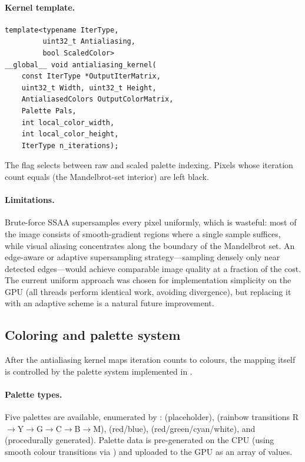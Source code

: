\paragraph{Kernel template.}
\begin{verbatim}
template<typename IterType,
         uint32_t Antialiasing,
         bool ScaledColor>
__global__ void antialiasing_kernel(
    const IterType *OutputIterMatrix,
    uint32_t Width, uint32_t Height,
    AntialiasedColors OutputColorMatrix,
    Palette Pals,
    int local_color_width,
    int local_color_height,
    IterType n_iterations);
\end{verbatim}
The  flag selects between raw and scaled palette
indexing.  Pixels whose iteration count equals 
(the Mandelbrot-set interior) are left black.

\paragraph{Limitations.}
Brute-force SSAA supersamples every pixel uniformly, which is
wasteful: most of the image consists of smooth-gradient regions where
a single sample suffices, while visual aliasing concentrates along the
boundary of the Mandelbrot set.  An edge-aware or adaptive
supersampling strategy---sampling densely only near detected
edges---would achieve comparable image quality at a fraction of the
cost.  The current uniform approach was chosen for implementation
simplicity on the GPU (all threads perform identical work, avoiding
divergence), but replacing it with an adaptive scheme is a natural
future improvement.

\subsection{Coloring and palette system}
\label{subsec:coloring}

After the antialiasing kernel maps iteration counts to colours, the
mapping itself is controlled by the palette system implemented in
.

\paragraph{Palette types.}
Five palettes are available, enumerated by
:
 (placeholder),
 (rainbow transitions R$\to$Y$\to$G$\to$C$\to$B$\to$M),
 (red/blue),
 (red/green/cyan/white), and
 (procedurally generated).
Palette data is pre-generated on the CPU (using smooth colour
transitions via ) and uploaded to the GPU as an
array of  values.

